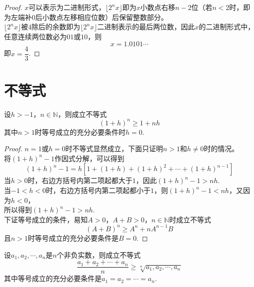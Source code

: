 \begin{proof}

    $x$可以表示为二进制形式，$\lfloor 2^n x \rfloor$即为$x$小数点右移$n - 2$位（若$n < 2$时，即为左端补$0$后小数点左移相应位数）后保留整数部分。\\
    $\lfloor 2^n x \rfloor$被$4$除后的余数即为$\lfloor 2^n x \rfloor$二进制表示的最后两位数，因此$x$的二进制形式中，任意连续两位数必为$01$或$10$，则
    $$x = 1.0101 \cdots$$
    即$x = \dfrac{4}{3}$.
    
\end{proof}

\section{不等式}

\begin{theorem}[Bernoulli不等式]

    设$h > -1$，$n \in \mathbb{N}$，则成立不等式
    $$(1 + h)^n \geq 1 + nh$$
    其中$n > 1$时等号成立的充分必要条件时$h = 0$.

\end{theorem}

\begin{proof}
    
    $n = 1$或$h = 0$时不等式显然成立，下面只证明$n > 1$和$h\neq 0$时的情况。\\
    将$(1 + h)^n - 1$作因式分解，可以得到
    $$(1 + h)^n - 1 = h[1 + (1 + h) + (1 + h)^2 + \cdots + (1 + h)^{n - 1}]$$
    当$h > 0$时，右边方括号内第二项起都大于$1$，因此$(1 + h)^n - 1 > nh$. \\
    当$-1 < h < 0$时，右边方括号内第二项起都小于$1$，则$(1 + h)^n - 1 < nh$，又因为$h < 0$，\\
    所以得到$(1 + h)^n - 1 > nh$. \\
    下证等号成立的条件，易知$A > 0$，$A + B > 0$，$n \in \mathbb{N}$时成立不等式
    $$(A + B)^n \geq A^n + nA^{n - 1}B$$
    且$n > 1$时等号成立的充分必要条件是$B = 0$.

\end{proof}

\begin{theorem}
    
    设$a_1, a_2, \cdots, a_n$是$n$个非负实数，则成立不等式
    $$\dfrac{a_1 + a_2 + \cdots + a_n}{n} \geq \sqrt[n]{a_1, a_2, \cdots, a_n}$$
    其中等号成立的充分必要条件是$a_1 = a_2 = \cdots = a_n$.

\end{theorem}

